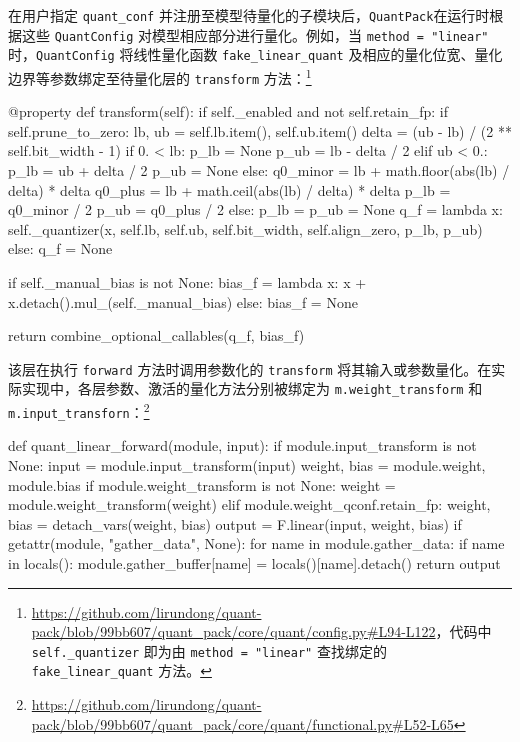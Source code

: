 \documentclass[
]{shtthesis}
\providecommand{\QP}{\texttt{QuantPack}}
\begin{document}
在用户指定 \verb|quant_conf| 并注册至模型待量化的子模块后，\QP 在运行时根据这些 \verb|QuantConfig| 对模型相应部分进行量化。例如，当 \texttt{method = "linear"} 时，\verb|QuantConfig| 将线性量化函数 \verb|fake_linear_quant| 及相应的量化位宽、量化边界等参数绑定至待量化层的 \verb|transform| 方法：\footnote{\url{https://github.com/lirundong/quant-pack/blob/99bb607/quant_pack/core/quant/config.py\#L94-L122}，代码中 \texttt{self.\_quantizer} 即为由 \texttt{method = "linear"} 查找绑定的 \texttt{fake\_linear\_quant} 方法。}
\begin{python}
@property
def transform(self):
    if self._enabled and not self.retain_fp:
        if self.prune_to_zero:
            lb, ub = self.lb.item(), self.ub.item()
            delta = (ub - lb) / (2 ** self.bit_width - 1)
            if 0. < lb:
                p_lb = None
                p_ub = lb - delta / 2
            elif ub < 0.:
                p_lb = ub + delta / 2
                p_ub = None
            else:
                q0_minor = lb + math.floor(abs(lb) / delta) * delta
                q0_plus = lb + math.ceil(abs(lb) / delta) * delta
                p_lb = q0_minor / 2
                p_ub = q0_plus / 2
        else:
            p_lb = p_ub = None
        q_f = lambda x: self._quantizer(x, self.lb, self.ub, self.bit_width, self.align_zero, p_lb, p_ub)
    else:
        q_f = None

    if self._manual_bias is not None:
        bias_f = lambda x: x + x.detach().mul_(self._manual_bias)
    else:
        bias_f = None

    return combine_optional_callables(q_f, bias_f)
\end{python}
该层在执行 \verb|forward| 方法时调用参数化的 \verb|transform| 将其输入或参数量化。在实际实现中，各层参数、激活的量化方法分别被绑定为 \verb|m.weight_transform| 和 \verb|m.input_transforn|：\footnote{\url{https://github.com/lirundong/quant-pack/blob/99bb607/quant_pack/core/quant/functional.py\#L52-L65}}
\begin{python}
def quant_linear_forward(module, input):
    if module.input_transform is not None:
        input = module.input_transform(input)
    weight, bias = module.weight, module.bias
    if module.weight_transform is not None:
        weight = module.weight_transform(weight)
    elif module.weight_qconf.retain_fp:
        weight, bias = detach_vars(weight, bias)
    output = F.linear(input, weight, bias)
    if getattr(module, "gather_data", None):
        for name in module.gather_data:
            if name in locals():
                module.gather_buffer[name] = locals()[name].detach()
    return output
\end{python}
\end{document}
